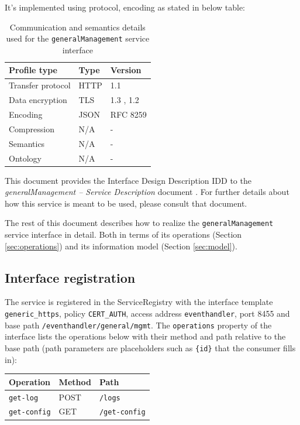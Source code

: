 \documentclass[a4paper]{arrowhead}
\begin{document}
It's implemented using protocol, encoding as stated in below table:
\begin{table}[ht!]
  \centering
  \begin{tabular}{|l|l|l|}
    \hline
    \rowcolor{gray!33} Profile type & Type & Version \\ \hline
    Transfer protocol & HTTP & 1.1 \cite{rfc9112} \\ \hline
    Data encryption & TLS & 1.3 \cite{rfc8446}, 1.2 \cite{rfc5246} \\ \hline
    Encoding & JSON & RFC 8259 \cite{rfc8259} \\ \hline
    Compression & N/A & - \\ \hline
    Semantics & N/A & - \\ \hline
    Ontology & N/A & - \\ \hline
  \end{tabular}
  \caption{Communication and semantics details used for the \texttt{generalManagement} service interface}
  \label{tab:comunication_semantics_profile}
\end{table}

This document provides the Interface Design Description IDD to the \textit{generalManagement -- Service Description} document \cite{eh-generalManagement-sd}.
For further details about how this service is meant to be used, please consult that document.

The rest of this document describes how to realize the \texttt{generalManagement} service
interface in detail. Both in terms of its operations (Section \ref{sec:operations}) and its information model (Section \ref{sec:model}).

\subsection{Interface registration}

The service is registered in the ServiceRegistry with the interface template \texttt{generic\_\allowbreak{}https}, policy \texttt{CERT\_\allowbreak{}AUTH}, access address \texttt{eventhandler}, port 8455 and base path \texttt{/\allowbreak{}eventhandler/\allowbreak{}general/\allowbreak{}mgmt}. The \texttt{operations} property of the interface lists the operations below with their method and path relative to the base path (path parameters are placeholders such as \texttt{\{id\}} that the consumer fills in):

\noindent\begin{longtable}{| p{5.2cm} | p{1.6cm} | p{8.4cm} |} \hline
\rowcolor{gray!33} Operation & Method & Path \\ \hline \endhead
\texttt{get-\allowbreak{}log} & POST & \texttt{/\allowbreak{}logs} \\ \hline
\texttt{get-\allowbreak{}config} & GET & \texttt{/\allowbreak{}get-\allowbreak{}config} \\ \hline
\end{longtable}
\end{document}
